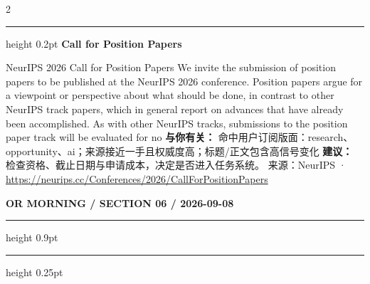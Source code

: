 \documentclass[10.5pt]{ctexart}
\begin{document}
\begin{multicols}{2}
\vspace{2mm}
\hrule height 0.2pt
\vspace{2mm}
{\large\bfseries Call for Position Papers}\par
NeurIPS 2026 Call for Position Papers We invite the submission of position papers to be published at the NeurIPS 2026 conference. Position papers argue for a viewpoint or perspective about what should be done, in contrast to other NeurIPS track papers, which in general report on advances that have already been accomplished. As with other NeurIPS tracks, submissions to the position paper track will be evaluated for no
\textbf{与你有关：} 命中用户订阅版面：research、opportunity、ai；来源接近一手且权威度高；标题/正文包含高信号变化
\textbf{建议：} 检查资格、截止日期与申请成本，决定是否进入任务系统。
{\footnotesize\color{ormuted} 来源：NeurIPS · \url{https://neurips.cc/Conferences/2026/CallForPositionPapers}}
\end{multicols}
\newpage
{\small\bfseries OR MORNING / SECTION 06 / 2026-09-08}
\vspace{2mm}
\hrule height 0.9pt
\vspace{1.5mm}
\hrule height 0.25pt
\vspace{4mm}
\end{document}
